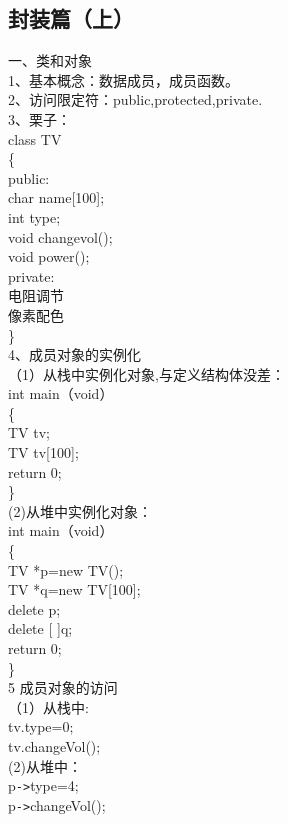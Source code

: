 \documentclass[a4paper,12pt]{article}
\begin{document}
\begin{CJK*}{UTF8}{gbsn}
\begin{flushleft}
\part{封装篇（上）}
\begin{flushleft}
一、类和对象\\
 1、基本概念：数据成员，成员函数。\\
 2、访问限定符：public,protected,private.\\ 
 3、栗子：\\       
\quad class TV\\
\quad \{\\
\quad public:\\
\qquad char name[100];\\
\qquad  int type;\\

\qquad  void changevol();\\
\qquad  void power();\\
\quad private:\\
\qquad  电阻调节\\
\qquad  像素配色\\
\quad \}\\
4、成员对象的实例化\\
（1）从栈中实例化对象,与定义结构体没差：\\
\quad int main（void）\\
\quad \{\\
\qquad TV tv;\\
\qquad TV tv[100];\\
\qquad return 0;\\
\quad\}\\
(2)从堆中实例化对象：\\
\quad int main（void）\\
\quad \{\\
\qquad TV *p=new TV();\\
\qquad TV *q=new TV[100];\\
\qquad delete p;\\
\qquad delete [ ]q;\\
\qquad return 0;\\
\quad\}\\
5 成员对象的访问\\
（1）从栈中:\\
\qquad tv.type=0;\\
\qquad tv.changeVol();\\
(2)从堆中：\\
\qquad p\verb|->|type=4;\\
\qquad p\verb|->|changeVol();\\





\end{flushleft}





\end{flushleft}


 
\end{CJK*}
\end{document}
